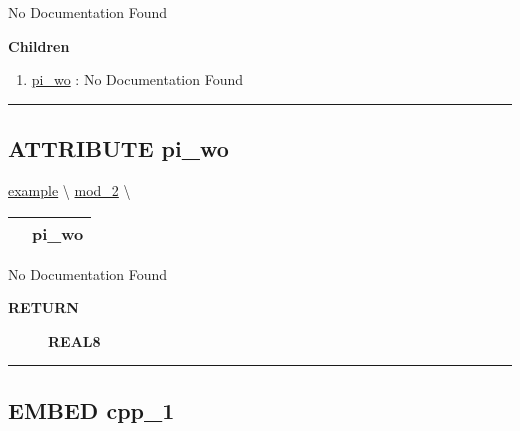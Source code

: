 \par





No Documentation Found







\textbf{Children}
\begin{enumerate}
\item \hyperlink{ecldoc:example.mod_2.pi_wo}{pi\_wo}
: No Documentation Found
\end{enumerate}

\rule{\linewidth}{0.5pt}

\subsection*{\textsf{\colorbox{headtoc}{\color{white} ATTRIBUTE}
pi\_wo}}

\hypertarget{ecldoc:example.mod_2.pi_wo}{}
\hspace{0pt} \hyperlink{ecldoc:example}{example} \textbackslash 
\hspace{0pt} \hyperlink{ecldoc:example.mod_2}{mod_2} \textbackslash 

{\renewcommand{\arraystretch}{1.5}
\begin{tabularx}{\textwidth}{|>{\raggedright\arraybackslash}l|X|}
\hline
\hspace{0pt}\mytexttt{\color{red} } & \textbf{pi\_wo} \\
\hline
\end{tabularx}
}

\par





No Documentation Found








\par
\begin{description}
\item [\colorbox{tagtype}{\color{white} \textbf{\textsf{RETURN}}}] \textbf{REAL8} 
\end{description}




\rule{\linewidth}{0.5pt}


\subsection*{\textsf{\colorbox{headtoc}{\color{white} EMBED}
cpp\_1}}

